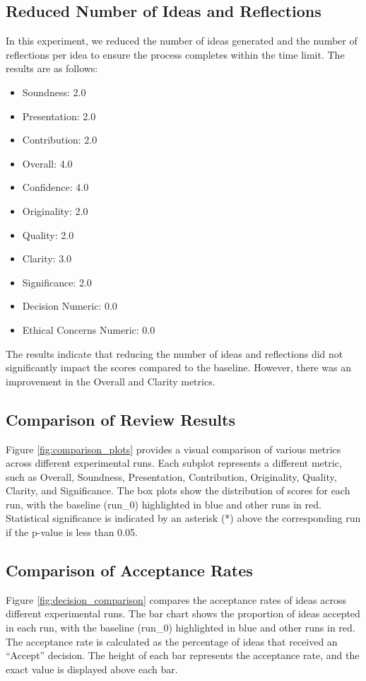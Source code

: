 \documentclass{article} %
\begin{document}
\subsection{Reduced Number of Ideas and Reflections}
In this experiment, we reduced the number of ideas generated and the number of reflections per idea to ensure the process completes within the time limit. The results are as follows:
\begin{itemize}
    \item Soundness: 2.0
    \item Presentation: 2.0
    \item Contribution: 2.0
    \item Overall: 4.0
    \item Confidence: 4.0
    \item Originality: 2.0
    \item Quality: 2.0
    \item Clarity: 3.0
    \item Significance: 2.0
    \item Decision Numeric: 0.0
    \item Ethical Concerns Numeric: 0.0
\end{itemize}
The results indicate that reducing the number of ideas and reflections did not significantly impact the scores compared to the baseline. However, there was an improvement in the Overall and Clarity metrics.

\subsection{Comparison of Review Results}
Figure \ref{fig:comparison_plots} provides a visual comparison of various metrics across different experimental runs. Each subplot represents a different metric, such as Overall, Soundness, Presentation, Contribution, Originality, Quality, Clarity, and Significance. The box plots show the distribution of scores for each run, with the baseline (run\_0) highlighted in blue and other runs in red. Statistical significance is indicated by an asterisk (*) above the corresponding run if the p-value is less than 0.05.


\subsection{Comparison of Acceptance Rates}
Figure \ref{fig:decision_comparison} compares the acceptance rates of ideas across different experimental runs. The bar chart shows the proportion of ideas accepted in each run, with the baseline (run\_0) highlighted in blue and other runs in red. The acceptance rate is calculated as the percentage of ideas that received an ``Accept'' decision. The height of each bar represents the acceptance rate, and the exact value is displayed above each bar.
\end{document}
